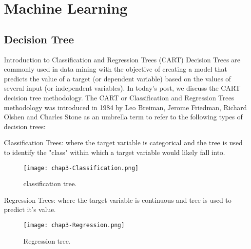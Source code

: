 \chapter{Machine Learning} %

\label{Chapter3} %


\section{Decision Tree}

\begin{compactitem}

\item {Introduction to Classification and Regression Trees (CART)}
Decision Trees are commonly used in data mining with the objective of creating a model that predicts the value of a target (or dependent variable) based on the values of several input (or independent variables).  In today's post, we discuss the CART decision tree methodology.  The CART or Classification and Regression Trees methodology was introduced in 1984 by Leo Breiman, Jerome Friedman, Richard Olshen and Charles Stone as an umbrella term to refer to the following types of decision trees:\cite{blog-CART-Intro}

\item {Classification Trees}: where the target variable is categorical and the tree is used to identify the "class" within which a target variable would likely fall into.

\begin{figure}[ht]
  \centering
	\texttt{[image: chap3-Classification.png]}
  \caption{classification tree.}
  \label{fig:chap3-Classification}
\end{figure}

\item {Regression Trees}: where the target variable is continuous and tree is used to predict it's value.
\begin{figure}[ht]
  \centering
    \texttt{[image: chap3-Regression.png]}
  \caption{Regression tree.}
  \label{fig:chap3-Regression}
\end{figure}


\end{compactitem}
